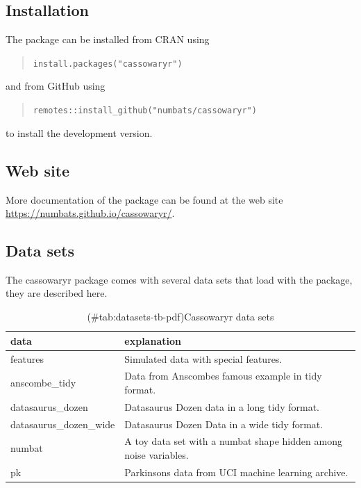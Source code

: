 \hypertarget{installation}{%
\subsection{Installation}\label{installation}}

The package can be installed from CRAN using

\begin{quote}
\texttt{install.packages("cassowaryr")}
\end{quote}

and from GitHub using

\begin{quote}
\texttt{remotes::install\_github("numbats/cassowaryr")}
\end{quote}

to install the development version.

\hypertarget{web-site}{%
\subsection{Web site}\label{web-site}}

More documentation of the package can be found at the web site
\url{https://numbats.github.io/cassowaryr/}.

\hypertarget{data-sets}{%
\subsection{Data sets}\label{data-sets}}

The cassowaryr package comes with several data sets that load with the
package, they are described here.

\begin{Schunk}
\begin{table}

\caption{(\#tab:datasets-tb-pdf)Cassowaryr data sets}
\centering
\begin{tabular}[t]{>{\raggedright\arraybackslash}p{3cm}l}
\toprule
data & explanation\\
\midrule
features & Simulated data with special features.\\
anscombe\_tidy & Data from Anscombes famous example in tidy format.\\
datasaurus\_dozen & Datasaurus Dozen data in a long tidy format.\\
datasaurus\_dozen\_wide & Datasaurus Dozen Data in a wide tidy format.\\
numbat & A toy data set with a numbat shape hidden among noise variables.\\
\addlinespace
pk & Parkinsons data from UCI machine learning archive.\\
\bottomrule
\end{tabular}
\end{table}

\end{Schunk}

